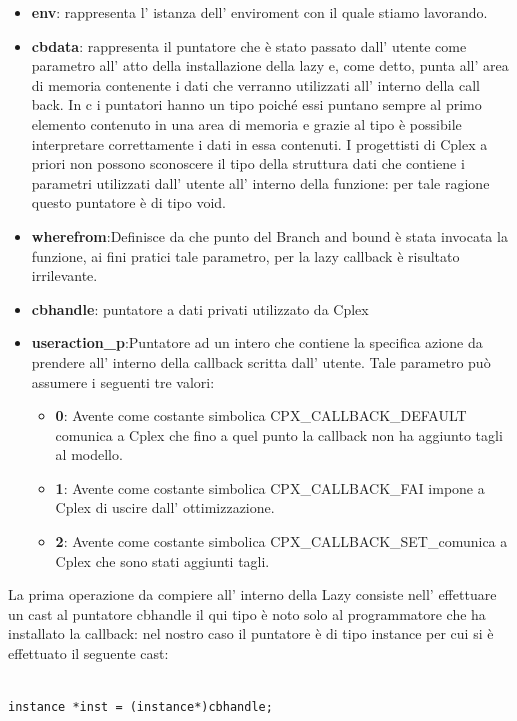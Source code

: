 \documentclass[11pt]{article}
\begin{document}
\begin{itemize}
	\item \textbf{env}: rappresenta l’ istanza dell’ enviroment  con il quale stiamo lavorando.
	\item \textbf{cbdata}: rappresenta il puntatore che è stato passato dall’ utente come parametro all’ atto della installazione della lazy e, come detto, punta all’ area di memoria contenente i dati che verranno utilizzati all’ interno della call back. In c i puntatori hanno un tipo poiché essi puntano sempre al primo elemento contenuto in una area di memoria e grazie al tipo è possibile interpretare correttamente i dati in essa contenuti. I progettisti di Cplex a priori non possono sconoscere il tipo della struttura dati che contiene i parametri utilizzati dall’ utente all’ interno della funzione: per tale ragione questo puntatore è di tipo void.
	\item \textbf{wherefrom}:Definisce da che punto del Branch and bound è stata invocata la funzione, ai fini pratici tale parametro, per la lazy callback è risultato irrilevante. 
	\item \textbf{cbhandle}: puntatore a dati privati utilizzato da Cplex
	\item \textbf{useraction_p}:Puntatore ad un intero che contiene la specifica azione da prendere all’ interno della callback scritta dall’ utente. Tale parametro può assumere i seguenti tre valori:
	
	\begin{itemize}
	\item \textbf{0}: Avente come costante simbolica CPX_CALLBACK_DEFAULT comunica a Cplex che fino a quel punto la callback non ha aggiunto tagli al modello.
	\item \textbf{1}: Avente come costante simbolica CPX_CALLBACK_FAI impone a Cplex di uscire dall' ottimizzazione.
	\item \textbf{2}: Avente come costante simbolica CPX_CALLBACK_SET_comunica a Cplex che sono stati aggiunti tagli.
	\end{itemize}

\end{itemize}


La prima operazione da compiere all' interno della Lazy consiste nell' effettuare un cast al puntatore cbhandle il qui tipo è noto solo al programmatore che ha installato la callback: nel nostro caso il puntatore è di tipo instance per cui si è effettuato il seguente cast:


\begin{lstlisting}

instance *inst = (instance*)cbhandle;

\end{lstlisting}
\end{document}
